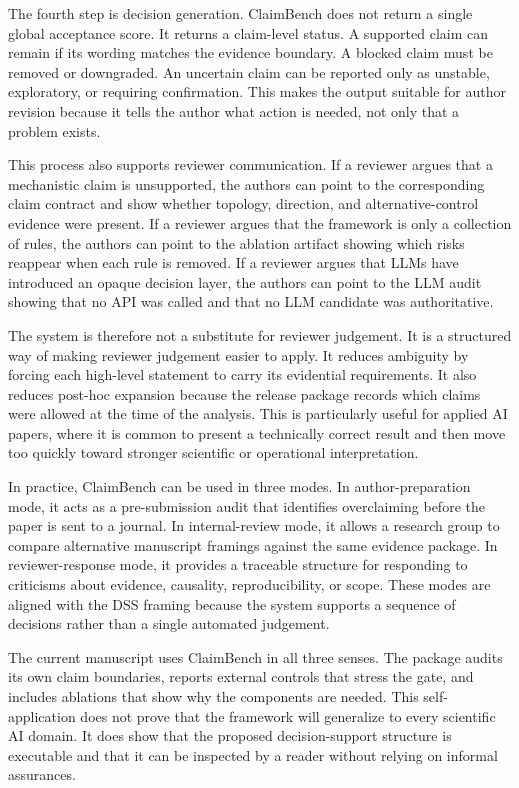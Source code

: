 The fourth step is decision generation. ClaimBench does not return a single global acceptance score. It returns a claim-level status. A supported claim can remain if its wording matches the evidence boundary. A blocked claim must be removed or downgraded. An uncertain claim can be reported only as unstable, exploratory, or requiring confirmation. This makes the output suitable for author revision because it tells the author what action is needed, not only that a problem exists.



This process also supports reviewer communication. If a reviewer argues that a mechanistic claim is unsupported, the authors can point to the corresponding claim contract and show whether topology, direction, and alternative-control evidence were present. If a reviewer argues that the framework is only a collection of rules, the authors can point to the ablation artifact showing which risks reappear when each rule is removed. If a reviewer argues that LLMs have introduced an opaque decision layer, the authors can point to the LLM audit showing that no API was called and that no LLM candidate was authoritative.

The system is therefore not a substitute for reviewer judgement. It is a structured way of making reviewer judgement easier to apply. It reduces ambiguity by forcing each high-level statement to carry its evidential requirements. It also reduces post-hoc expansion because the release package records which claims were allowed at the time of the analysis. This is particularly useful for applied AI papers, where it is common to present a technically correct result and then move too quickly toward stronger scientific or operational interpretation.

In practice, ClaimBench can be used in three modes. In author-preparation mode, it acts as a pre-submission audit that identifies overclaiming before the paper is sent to a journal. In internal-review mode, it allows a research group to compare alternative manuscript framings against the same evidence package. In reviewer-response mode, it provides a traceable structure for responding to criticisms about evidence, causality, reproducibility, or scope. These modes are aligned with the DSS framing because the system supports a sequence of decisions rather than a single automated judgement.

The current manuscript uses ClaimBench in all three senses. The package audits its own claim boundaries, reports external controls that stress the gate, and includes ablations that show why the components are needed. This self-application does not prove that the framework will generalize to every scientific AI domain. It does show that the proposed decision-support structure is executable and that it can be inspected by a reader without relying on informal assurances.

